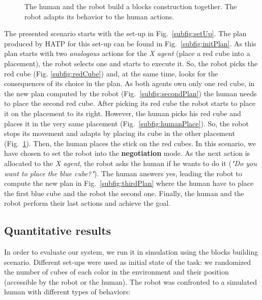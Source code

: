 \documentclass[english,a4paper,11pt,twoside]{StyleThese}
\begin{document}
\begin{figure}[!h]
{       \label{subfig:robotAdapts}
   }
    \caption{The human and the robot build a blocks construction together. The robot adapts its behavior to the human actions.}
\end{figure}


The presented scenario starts with the set-up in Fig.~\ref{subfig:setUp}. The plan produced by HATP for this set-up can be found in Fig.~\ref{subfig:initPlan}. As this plan starts with two \textit{analogous} actions for the \textit{X agent} (place a red cube into a placement), the robot selects one and starts to execute it. So, the robot picks the red cube (Fig. \ref{subfig:redCube}) and, at the same time, looks for the consequences of its choice in the plan. As both agents own only one red cube, in the new plan computed by the robot (Fig.~\ref{subfig:secondPlan}) the human needs to place the second red cube. After picking its red cube the robot starts to place it on the placement to its right. However, the human picks his red cube and places it in the very same placement (Fig.~\ref{subfig:humanPlace}). So, the robot stops its movement and adapts by placing its cube in the other placement (Fig.~\ref{subfig:robotAdapts}). Then, the human places the stick on the red cubes. In this scenario, we have chosen to set the robot into the \textbf{negotiation} mode. As the next action is allocated to the \textit{X agent}, the robot asks the human if he wants to do it (\textit{"Do you want to place the blue cube?"}). The human answers yes, leading the robot to compute the new plan in Fig.~\ref{subfig:thirdPlan} where the human have to place the first blue cube and the robot the second one. Finally, the human and the robot perform their last actions and achieve the goal.


\subsection{Quantitative results}

In order to evaluate our system, we run it in simulation using the blocks building scenario. Different set-ups were used as initial state of the task: we randomized the number of cubes of each color in the environment and their position (accessible by the robot or the human). The robot was confronted to a simulated human with different types of behaviors:
\end{document}
